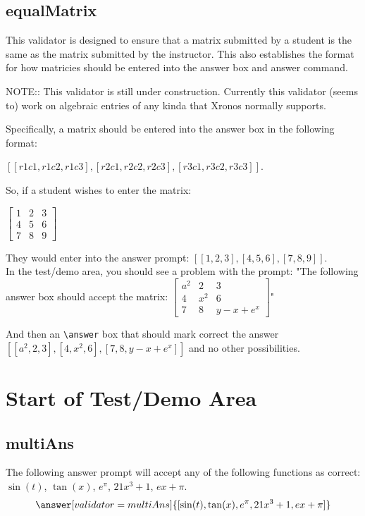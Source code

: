 \documentclass{ximera}
\begin{document}
    \subsection*{equalMatrix}

        This validator is designed to ensure that a matrix submitted by a student is the same as the matrix submitted by the instructor. This also establishes the format for how matricies should be entered into the answer box and answer command.
    
        NOTE:: This validator is still under construction. Currently this validator (seems to) work on algebraic entries of any kinda that Xronos normally supports.
        
        Specifically, a matrix should be entered into the answer box in the following format:
        
        $[ [r1c1,r1c2,r1c3],[r2c1,r2c2,r2c3],[r3c1,r3c2,r3c3] ]$.
        
        So, if a student wishes to enter the matrix:
        
        $\left[\begin{matrix}
        1 & 2 & 3 \\
        4 & 5 & 6 \\
        7 & 8 & 9
        \end{matrix}\right]$
        
        They would enter into the answer prompt: $[ [1,2,3], [4,5,6], [7,8,9] ]$.\\

        In the test/demo area, you should see a problem with the prompt:
            "The following answer box should accept the matrix:
            $\left[\begin{matrix}
            a^2 & 2 & 3 \\
            4 & x^2 & 6 \\
            7 & 8 & y-x+e^x
            \end{matrix}\right]$"

            And then an \verb|\answer| box that should mark correct the answer $[ [a^2,2,3], [4,x^2,6], [7,8,y-x+e^x] ]$ and no other possibilities.


\section{Start of Test/Demo Area}

    \subsection*{multiAns}
        \begin{problem}
            The following answer prompt will accept any of the following functions as correct: $\sin(t)$, $\tan(x)$, $e^\pi$, $21x^3 + 1$, $ex + \pi$.
            \[
                \answer[validator=multiAns]{[\sin(t),\tan(x),e^\pi,21x^3 + 1,ex + \pi]}
            \]
        \end{problem}
\end{document}
